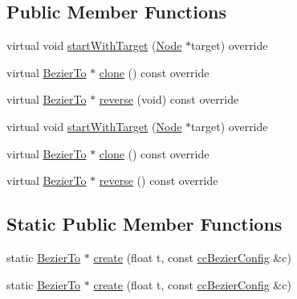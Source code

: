 \subsection*{Public Member Functions}
\begin{DoxyCompactItemize}
\item 
virtual void \hyperlink{classBezierTo_ad45e47e3da2159e77c5b82fa1b6b2b1a}{start\+With\+Target} (\hyperlink{classNode}{Node} $\ast$target) override
\item 
virtual \hyperlink{classBezierTo}{Bezier\+To} $\ast$ \hyperlink{classBezierTo_ace522cd65d274c3f0a77c7925a2f12d5}{clone} () const override
\item 
virtual \hyperlink{classBezierTo}{Bezier\+To} $\ast$ \hyperlink{classBezierTo_a18d090decbea9839a379121a012063f6}{reverse} (void) const override
\item 
virtual void \hyperlink{classBezierTo_a0afa7e2b008c5d8f8a63d559face86a3}{start\+With\+Target} (\hyperlink{classNode}{Node} $\ast$target) override
\item 
virtual \hyperlink{classBezierTo}{Bezier\+To} $\ast$ \hyperlink{classBezierTo_a3cb15fbd6d2b9038ab3f25608765d54a}{clone} () const override
\item 
virtual \hyperlink{classBezierTo}{Bezier\+To} $\ast$ \hyperlink{classBezierTo_a96685cb733eb9f61b6e6550bcd210f93}{reverse} () const override
\end{DoxyCompactItemize}
\subsection*{Static Public Member Functions}
\begin{DoxyCompactItemize}
\item 
static \hyperlink{classBezierTo}{Bezier\+To} $\ast$ \hyperlink{classBezierTo_ab101906196726dc6cd446999064292ff}{create} (float t, const \hyperlink{struct__ccBezierConfig}{cc\+Bezier\+Config} \&c)
\item 
static \hyperlink{classBezierTo}{Bezier\+To} $\ast$ \hyperlink{classBezierTo_abf8120b922511304e03e05b9589adc2f}{create} (float t, const \hyperlink{struct__ccBezierConfig}{cc\+Bezier\+Config} \&c)
\end{DoxyCompactItemize}
